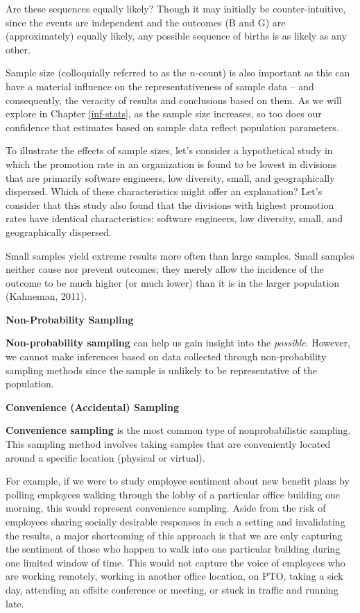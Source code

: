 \documentclass[]{book}
\begin{document}
Are these sequences equally likely? Though it may initially be counter-intuitive, since the events are independent and the outcomes (B and G) are (approximately) equally likely, any possible sequence of births is as likely as any other.

Sample size (colloquially referred to as the \(n\)-count) is also important as this can have a material influence on the representativeness of sample data -- and consequently, the veracity of results and conclusions based on them. As we will explore in Chapter \ref{inf-stats}, as the sample size increases, so too does our confidence that estimates based on sample data reflect population parameters.

To illustrate the effects of sample sizes, let's consider a hypothetical study in which the promotion rate in an organization is found to be lowest in divisions that are primarily software engineers, low diversity, small, and geographically dispersed. Which of these characteristics might offer an explanation? Let's consider that this study also found that the divisions with highest promotion rates have identical characteristics: software engineers, low diversity, small, and geographically dispersed.

Small samples yield extreme results more often than large samples. Small samples neither cause nor prevent outcomes; they merely allow the incidence of the outcome to be much higher (or much lower) than it is in the larger population (Kahneman, 2011).

\textbf{Non-Probability Sampling}

\textbf{Non-probability sampling} can help us gain insight into the \emph{possible}. However, we cannot make inferences based on data collected through non-probability sampling methods since the sample is unlikely to be representative of the population.

\textbf{Convenience (Accidental) Sampling}

\textbf{Convenience sampling} is the most common type of nonprobabilistic sampling. This sampling method involves taking samples that are conveniently located around a specific location (physical or virtual).

For example, if we were to study employee sentiment about new benefit plans by polling employees walking through the lobby of a particular office building one morning, this would represent convenience sampling. Aside from the risk of employees sharing socially desirable responses in such a setting and invalidating the results, a major shortcoming of this approach is that we are only capturing the sentiment of those who happen to walk into one particular building during one limited window of time. This would not capture the voice of employees who are working remotely, working in another office location, on PTO, taking a sick day, attending an offsite conference or meeting, or stuck in traffic and running late.
\end{document}
